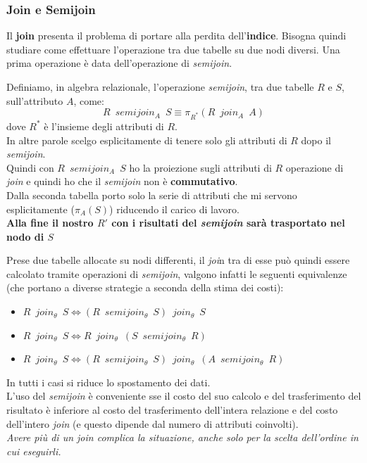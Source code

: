 \documentclass[a4paper,12pt, oneside]{book}
\begin{document}
\subsubsection{Join e Semijoin}
Il \textbf{join} presenta il problema di portare alla perdita
dell'\textbf{indice}. Bisogna quindi studiare come effettuare l'operazione tra
due tabelle su due nodi diversi. Una prima operazione è data dell'operazione di
\textit{semijoin}.
\begin{definizione}
  Definiamo, in algebra relazionale, l'operazione \textit{semijoin}, tra due
  tabelle $R$ e $S$, sull'attributo $A$, come:
  \[R\,\,\,semijoin_A\,\,\,S\equiv \pi_{R^*}(R\,\,\,join_A \,\,\,A)\]
  dove $R^*$ è l'insieme degli attributi di $R$.\\
  In altre parole scelgo esplicitamente di tenere solo gli attributi di $R$ dopo
  il \textit{semijoin}.\\
  Quindi con $R\,\,\,semijoin_A\,\,\,S$ ho la proiezione sugli attributi di $R$
  operazione di \textit{join} e quindi ho che il \textit{semijoin} non è
  \textbf{commutativo}.\\
  Dalla seconda tabella porto solo la serie di attributi che mi servono
  esplicitamente ($\pi_A(S)$) riducendo il carico di lavoro.\\
 \textbf{ Alla fine il nostro $R'$ con i risultati del \textit{semijoin} sarà
  trasportato nel nodo di $S$}
\end{definizione}
Prese due tabelle allocate su nodi differenti, il \textit{joi}n tra di esse può
quindi essere calcolato tramite operazioni di \textit{semijoin}, valgono infatti
le seguenti equivalenze (che portano a diverse strategie a seconda della stima
dei costi):
\begin{itemize}
  \item
  $R\,\,\,join_{\theta}\,\,\,S \iff (R\,\,\,semijoin_{\theta}\,\,\,S)
  \,\,\,join_\theta\,\,\,S$
  \item $R\,\,\,join_{\theta}\,\,\,S \iff
  R\,\,\,join_\theta\,\,\,(S\,\,\,semijoin_{\theta}\,\,\,R)$ 
  \item $R\,\,\,join_{\theta}\,\,\,S \iff (R\,\,\,semijoin_{\theta}\,\,\,S)
  \,\,\,join_\theta\,\,\,(A\,\,\,semijoin_{\theta}\,\,\,R)$
\end{itemize}
In tutti i casi si riduce lo spostamento dei dati.\\
L'uso del \textit{semijoin} è conveniente sse il costo del suo calcolo e del
trasferimento del risultato è inferiore al costo del trasferimento dell'intera
relazione e del costo dell'intero \textit{join} (e questo dipende dal numero di
attributi coinvolti).\\
\textit{Avere più di un \textit{join} complica la situazione, anche solo per la
  scelta dell'ordine in cui eseguirli.}
\end{document}
